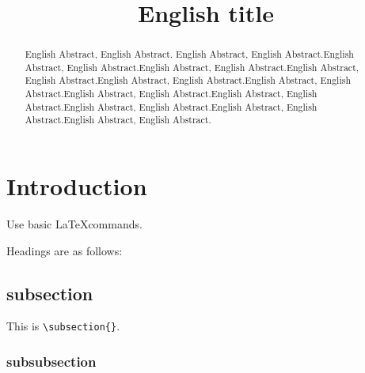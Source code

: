 \documentclass{jsarticle}
\title{English title}
\begin{document}
%

\makeatletter 
\def\ps@myheadings{%
\let\ps@jpl@in\ps@plain%
\def\@evenhead{\reset@font\hfil\leftmark\hfil}%
\def\@oddhead{\reset@font\hfil\rightmark\hfil}%
\let\@mkboth\@gobbletwo%
\let\sectionmark\@gobble%
\let\subsectionmark\@gobble%
% 
\def\@oddfoot{\reset@font\hfil-- \thepage --\hfil}%
\let\@evenfoot\@oddfoot 
} 
\makeatother 
\setcounter{page}{17} 
\pagestyle{myheadings} 
\maketitle
\thispagestyle{myheadings}

\begin{abstract}

English Abstract, English Abstract. English Abstract, English
 Abstract.English Abstract, English Abstract.English Abstract, English
 Abstract.English Abstract, English Abstract.English Abstract, English
 Abstract.English Abstract, English Abstract.English Abstract, English
 Abstract.English Abstract, English Abstract.English Abstract, English
 Abstract.English Abstract, English Abstract.English Abstract, English
 Abstract.

\end{abstract}

\section{Introduction}

Use basic \LaTeX commands.

Headings are as follows:

\subsection{subsection}

This is \verb|\subsection{}|.

\subsubsection{subsubsection}
\end{document}
